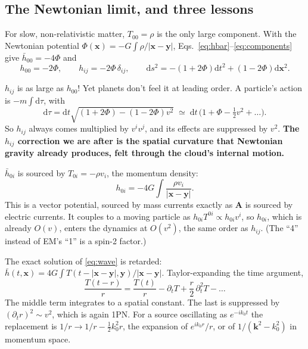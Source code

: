 \documentclass[11pt]{article}
\newcommand{\bx}{\mathbf{x}}\newcommand{\by}{\mathbf{y}}\newcommand{\bv}{\mathbf{v}}
\newcommand{\dd}{\mathrm{d}}
\begin{document}
\subsection{The Newtonian limit, and three lessons}
For slow, non-relativistic matter, $T_{00}=\rho$ is the only large component. With the Newtonian potential $\Phi(\bx)=-G\int\rho/|\bx-\by|$, Eqs.~\eqref{eq:hbar}--\eqref{eq:components} give $\bar h_{00}=-4\Phi$ and
\begin{equation}
h_{00}=-2\Phi,\qquad h_{ij}=-2\Phi\,\delta_{ij},\qquad
\dd s^2=-(1+2\Phi)\dd t^2+(1-2\Phi)\dd\bx^2.
\label{eq:newtmetric}
\end{equation}
\begin{idea}
$h_{ij}$ is as large as $h_{00}$! Yet planets don't feel it at leading order. A particle's action is $-m\int\dd\tau$, with
\[
\dd\tau=\dd t\sqrt{(1+2\Phi)-(1-2\Phi)v^2}\;\simeq\;\dd t\,\Big(1+\Phi-\tfrac12v^2+\dots\Big).
\]
So $h_{ij}$ always comes multiplied by $v^iv^j$, and its effects are suppressed by $v^2$. \textbf{The $h_{ij}$ correction we are after is the spatial curvature that Newtonian gravity already produces, felt through the cloud's internal motion.}
\end{idea}
\begin{idea}
$\bar h_{0i}$ is sourced by $T_{0i}=-\rho v_i$, the momentum density:
\[
h_{0i}=-4G\int\frac{\rho v_i}{|\bx-\by|}.
\]
This is a vector potential, sourced by mass currents exactly as $\mathbf A$ is sourced by electric currents. It couples to a moving particle as $h_{0i}T^{0i}\propto h_{0i}v^i$, so $h_{0i}$, which is already $O(v)$, enters the dynamics at $O(v^2)$, the same order as $h_{ij}$. (The ``4'' instead of EM's ``1'' is a spin-2 factor.)
\end{idea}
\begin{idea}
The exact solution of \eqref{eq:wave} is retarded: $\bar h(t,\bx)=4G\int T(t-|\bx-\by|,\by)/|\bx-\by|$. Taylor-expanding the time argument,
\[
\frac{T(t-r)}{r}=\frac{T(t)}{r}-\partial_tT+\frac r2\,\partial_t^2T-\dots
\]
The middle term integrates to a spatial constant. The last is suppressed by $(\partial_t r)^2\sim v^2$, which is again 1PN. For a source oscillating as $e^{-ik_0t}$ the replacement is $1/r\to1/r-\tfrac12k_0^2r$, the expansion of $e^{ik_0r}/r$, or of $1/(\mathbf k^2-k_0^2)$ in momentum space.
\end{idea}

\end{document}
